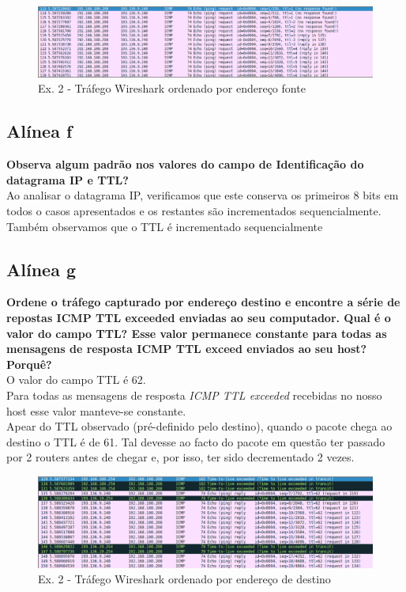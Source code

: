 \documentclass[a4paper]{report}
\begin{document}
\begin{figure}[H]
    \centering 
    \includegraphics[width=\textwidth]{images/wiresharkSourceEx2.png}
    \caption{Ex. 2 - Tráfego Wireshark ordenado por endereço fonte}
    \label{fig:wiresharkSourceEx2}
\end{figure}
\subsection{Alínea f}
\textbf{Observa algum padrão nos valores do campo de Identificação do datagrama
IP e TTL?}\\
Ao analisar o datagrama IP, verificamos que este conserva os primeiros 8 bits em
todos o casos apresentados e os restantes são incrementados sequencialmente.\\
Também observamos que o TTL é incrementado sequencialmente

\subsection{Alínea g}
\textbf{Ordene o tráfego capturado por endereço destino e encontre a série de
repostas ICMP TTL exceeded enviadas ao seu computador. Qual é o valor do campo
TTL? Esse valor permanece constante para todas as mensagens de resposta ICMP TTL
exceed enviados ao seu host? Porquê?}\\
O valor do campo TTL é 62.\\
Para todas as mensagens de resposta \textit{ICMP TTL exceeded} recebidas no
nosso host esse valor manteve-se constante.\\
Apear do TTL observado (pré-definido pelo destino), quando o pacote chega ao
destino o TTL é de 61. Tal devesse ao facto do pacote em questão ter passado por
2 routers antes de chegar e, por isso, ter sido decrementado 2 vezes.

\begin{figure}[H]
    \centering 
    \includegraphics[width=\textwidth]{images/wiresharkDestinyEx2.png}
    \caption{Ex. 2 - Tráfego Wireshark ordenado por endereço de destino}
    \label{fig:wiresharkDestinyEx2}
\end{figure}
\end{document}
